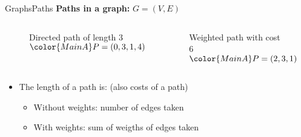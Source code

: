 
\begin{frame}{Graphs}{Paths}
  \textbf{Paths in a graph:}
         {\color{MainA}$G = (V , E)$}
  \begin{columns}
    \begin{column}[b]{0.5\linewidth}
      \begin{figure}
        \begin{adjustbox}{width=0.95\linewidth}
          
        \end{adjustbox}
        \caption{{\color{MainA}Directed path} of length 3 \newline
          ${\color{MainA}P} = (0, 3, 1, 4)$}
        \label{fig:graphs:directed_path_length}
      \end{figure}
    \end{column}
    \begin{column}[b]{0.5\linewidth}
      \begin{figure}
        \begin{adjustbox}{width=0.8\linewidth}
          
        \end{adjustbox}
        \caption{{\color{MainA}Weighted path} with cost 6 \newline
          ${\color{MainA}P} = (2, 3, 1)$}
        \label{fig:graphs:weighted_path_length}
      \end{figure}
    \end{column}
  \end{columns}
  \begin{itemize}
    \item<4->
      The {\color{MainA}length of a path} is:
      (also costs of a path)
      \begin{itemize}
        \item<5->
          Without weights:
          {\color{MainA}number of edges} taken
        \item<6->
          With weights:
          {\color{MainA}sum of weigths of edges} taken
      \end{itemize}
  \end{itemize}
\end{frame}


